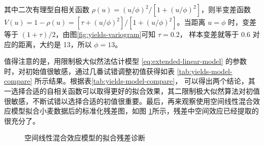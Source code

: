 \documentclass[12pt,a4paper,UTF8,twoside]{book}
\theoremstyle{definition}
\theoremstyle{definition}
\theoremstyle{definition}
\theoremstyle{remark}
\begin{document}
其中二次有理型自相关函数
\(\rho(u) = (u/\phi)^2/[1 + (u/\phi)^2]\)，则半变差函数
\(V(u) = 1-\rho(u) = [\tau + (u/\phi)^2]/[1 + (u/\phi)^2]\)。当距离
\(u = \phi\) 时，变差等于
\((1+\tau)/2\)，由图\ref{fig:yields-variogram}可知 \(\tau = 0.2\)，
样本变差就等于 0.6 对应的距离，大约是 13，所以 \(\phi=13\)。

值得注意的是，用限制极大似然法估计模型 \eqref{eq:extended-linear-model}
的参数时，对初始值很敏感，通过几番试错调整初值获得如表
\ref{tab:yields-model-compare}
所示结果。根据表\ref{tab:yields-model-compare}，
可以得出两个结论，其一选择合适的自相关函数可以取得更好的拟合效果，其二限制极大似然算法对初值很敏感，不断试错以选择合适的初值很重要。最后，再来观察使用空间线性混合效应模型拟合小麦数据后的标准化残差图，如图
\ref{fig:model-check}所示，残差中空间效应已经提取的很充分了。

\begin{figure}[!htb]

{\centering {}

}

\caption{空间线性混合效应模型的拟合残差诊断}\label{fig:model-check}
\end{figure}
\end{document}
